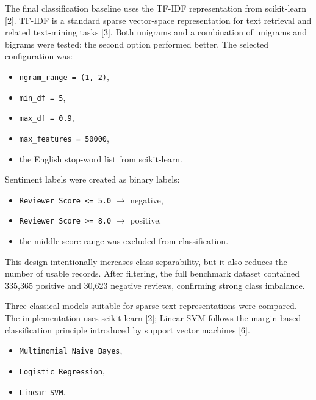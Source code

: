 \documentclass[twoside, 12pt]{article}
\begin{document}

The final classification baseline uses the TF-IDF representation from scikit-learn [2]. TF-IDF is a standard sparse vector-space representation for text retrieval and related text-mining tasks [3]. Both unigrams and a combination of unigrams and bigrams were tested; the second option performed better. The selected configuration was:

\begin{itemize}
    \item \texttt{ngram\_range = (1, 2)},
    \item \texttt{min\_df = 5},
    \item \texttt{max\_df = 0.9},
    \item \texttt{max\_features = 50000},
    \item the English stop-word list from scikit-learn.
\end{itemize}

Sentiment labels were created as binary labels:

\begin{itemize}
    \item \texttt{Reviewer\_Score <= 5.0} $\rightarrow$ negative,
    \item \texttt{Reviewer\_Score >= 8.0} $\rightarrow$ positive,
    \item the middle score range was excluded from classification.
\end{itemize}

This design intentionally increases class separability, but it also reduces the number of usable records. After filtering, the full benchmark dataset contained 335,365 positive and 30,623 negative reviews, confirming strong class imbalance.



Three classical models suitable for sparse text representations were compared. The implementation uses scikit-learn [2]; Linear SVM follows the margin-based classification principle introduced by support vector machines [6].

\begin{itemize}
    \item \texttt{Multinomial Naive Bayes},
    \item \texttt{Logistic Regression},
    \item \texttt{Linear SVM}.
\end{itemize}
\end{document}
